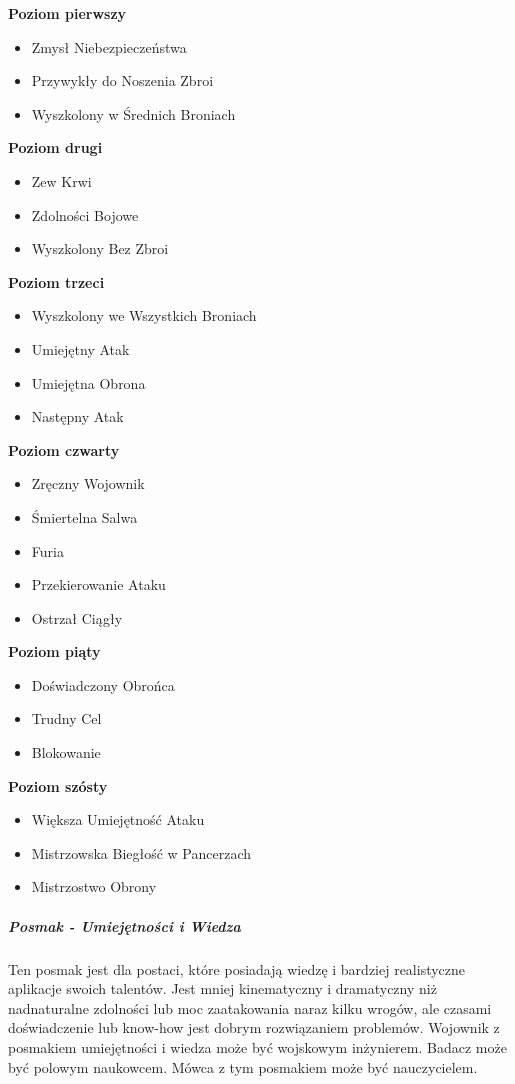 \textbf{Poziom pierwszy}
\begin{itemize}
\item Zmysł Niebezpieczeństwa
\item Przywykły do Noszenia Zbroi
\item Wyszkolony w Średnich Broniach
\end{itemize}

\textbf{Poziom drugi}
\begin{itemize}
\item Zew Krwi
\item Zdolności Bojowe
\item Wyszkolony Bez Zbroi
\end{itemize}

\textbf{Poziom trzeci}
\begin{itemize}
\item Wyszkolony we Wszystkich Broniach
\item Umiejętny Atak
\item Umiejętna Obrona
\item Następny Atak
\end{itemize}

\textbf{Poziom czwarty}
\begin{itemize}
\item Zręczny Wojownik
\item Śmiertelna Salwa
\item Furia
\item Przekierowanie Ataku
\item Ostrzał Ciągły
\end{itemize}

\textbf{Poziom piąty}
\begin{itemize}
\item Doświadczony Obrońca
\item Trudny Cel
\item Blokowanie
\end{itemize}

\textbf{Poziom szósty}
\begin{itemize}
\item Większa Umiejętność Ataku
\item Mistrzowska Biegłość w Pancerzach
\item Mistrzostwo Obrony
\end{itemize}

\subparagraph{Posmak - Umiejętności i Wiedza}

Ten posmak jest dla postaci, które posiadają wiedzę i bardziej realistyczne aplikacje swoich talentów. Jest mniej kinematyczny i dramatyczny niż nadnaturalne zdolności lub moc zaatakowania naraz kilku wrogów, ale czasami doświadczenie lub know-how jest dobrym rozwiązaniem problemów. Wojownik z posmakiem umiejętności i wiedza może być wojskowym inżynierem. Badacz może być polowym naukowcem. Mówca z tym posmakiem może być nauczycielem.

